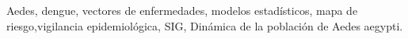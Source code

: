 \documentclass[conference]{IEEEtran}
\begin{document}
\begin{IEEEkeywords}
Aedes, dengue, vectores de enfermedades, modelos estadísticos, mapa de riesgo,vigilancia  epidemiológica, SIG, Dinámica de la población de Aedes aegypti.
\end{IEEEkeywords}

\IEEEpeerreviewmaketitle






\printbibliography

\end{document}
